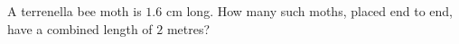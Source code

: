 A terrenella bee moth is $1.6$ cm long. How many such moths, placed end to end, have a combined length of $2$ metres?
